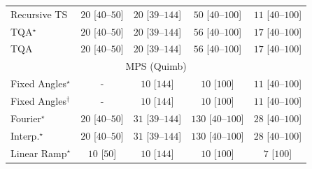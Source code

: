 \begin{tabular}{l|cccc|}
Recursive TS & {\cellcolor[HTML]{F5FBF2}} \color[HTML]{000000} $20$ [$40$--$50$] & {\cellcolor[HTML]{F5FBF2}} \color[HTML]{000000} $20$ [$39$--$144$] & {\cellcolor[HTML]{EFF9EC}} \color[HTML]{000000} $50$ [$40$--$100$] & {\cellcolor[HTML]{F6FCF4}} \color[HTML]{000000} $11$ [$40$--$100$] \\
TQA$^\star$ & {\cellcolor[HTML]{F5FBF2}} \color[HTML]{000000} $20$ [$40$--$50$] & {\cellcolor[HTML]{F5FBF2}} \color[HTML]{000000} $20$ [$39$--$144$] & {\cellcolor[HTML]{EEF8EA}} \color[HTML]{000000} $56$ [$40$--$100$] & {\cellcolor[HTML]{F5FBF3}} \color[HTML]{000000} $17$ [$40$--$100$] \\
TQA & {\cellcolor[HTML]{F5FBF2}} \color[HTML]{000000} $20$ [$40$--$50$] & {\cellcolor[HTML]{F5FBF2}} \color[HTML]{000000} $20$ [$39$--$144$] & {\cellcolor[HTML]{EEF8EA}} \color[HTML]{000000} $56$ [$40$--$100$] & {\cellcolor[HTML]{F5FBF3}} \color[HTML]{000000} $17$ [$40$--$100$] \\
\cline{1-5}
\multicolumn{5}{c}{\rule{0pt}{8pt}MPS (Quimb)} \\
\midrule
Fixed Angles$^\star$ & {\cellcolor[HTML]{000000}} \color[HTML]{F1F1F1} {\cellcolor{white}} \color{black} - & {\cellcolor[HTML]{F7FCF5}} \color[HTML]{000000} $10$ [$144$] & {\cellcolor[HTML]{F7FCF5}} \color[HTML]{000000} $10$ [$100$] & {\cellcolor[HTML]{F6FCF4}} \color[HTML]{000000} $11$ [$40$--$100$] \\
Fixed Angles$^\dagger$ & {\cellcolor[HTML]{000000}} \color[HTML]{F1F1F1} {\cellcolor{white}} \color{black} - & {\cellcolor[HTML]{F7FCF5}} \color[HTML]{000000} $10$ [$144$] & {\cellcolor[HTML]{F7FCF5}} \color[HTML]{000000} $10$ [$100$] & {\cellcolor[HTML]{F6FCF4}} \color[HTML]{000000} $11$ [$40$--$100$] \\
Fourier$^\star$ & {\cellcolor[HTML]{F5FBF2}} \color[HTML]{000000} $20$ [$40$--$50$] & {\cellcolor[HTML]{F3FAF0}} \color[HTML]{000000} $31$ [$39$--$144$] & {\cellcolor[HTML]{DDF2D8}} \color[HTML]{000000} $130$ [$40$--$100$] & {\cellcolor[HTML]{F4FBF1}} \color[HTML]{000000} $28$ [$40$--$100$] \\
Interp.$^\star$ & {\cellcolor[HTML]{F5FBF2}} \color[HTML]{000000} $20$ [$40$--$50$] & {\cellcolor[HTML]{F3FAF0}} \color[HTML]{000000} $31$ [$39$--$144$] & {\cellcolor[HTML]{DDF2D8}} \color[HTML]{000000} $130$ [$40$--$100$] & {\cellcolor[HTML]{F4FBF1}} \color[HTML]{000000} $28$ [$40$--$100$] \\
Linear Ramp$^\star$ & {\cellcolor[HTML]{F7FCF5}} \color[HTML]{000000} $10$ [$50$] & {\cellcolor[HTML]{F7FCF5}} \color[HTML]{000000} $10$ [$144$] & {\cellcolor[HTML]{F7FCF5}} \color[HTML]{000000} $10$ [$100$] & {\cellcolor[HTML]{F7FCF5}} \color[HTML]{000000} $7$ [$100$] \\

\end{tabular}
